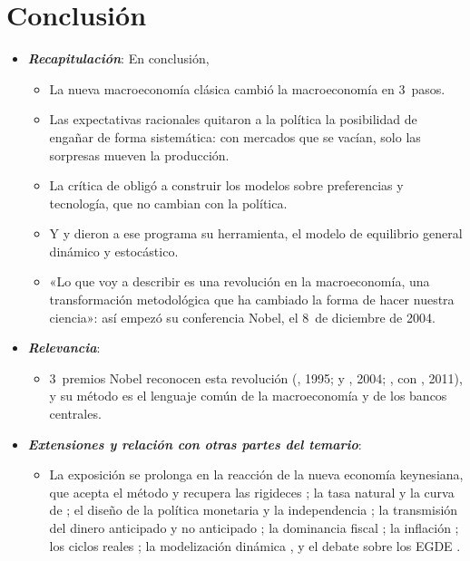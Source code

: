 \documentclass[11pt]{article}
\begin{document}
\section*{Conclusión}

\begin{itemize}
\item \textbf{\emph{Recapitulación}}: En conclusión,
  \begin{itemize}
  \item La nueva macroeconomía clásica cambió la macroeconomía en 3~pasos.

  \item Las expectativas racionales quitaron a la política la posibilidad de engañar de forma sistemática: con mercados que se vacían, solo las sorpresas mueven la producción.

  \item La crítica de  obligó a construir los modelos sobre preferencias y tecnología, que no cambian con la política.

  \item Y  y  dieron a ese programa su herramienta, el modelo de equilibrio general dinámico y estocástico.

  \item «Lo que voy a describir es una revolución en la macroeconomía, una transformación metodológica que ha cambiado la forma de hacer nuestra ciencia»: así empezó  su conferencia Nobel, el 8~de diciembre de 2004\nocite{Prescott2006Nobel}.
  \end{itemize}
\item \textbf{\emph{Relevancia}}:
  \begin{itemize}
  \item 3~premios Nobel reconocen esta revolución (, 1995;  y , 2004; , con , 2011)\nocite{NobelPrize1995Lucas,Nobel2004KydlandPrescott,Nobel2011SargentSims}, y su método es el lenguaje común de la macroeconomía y de los bancos centrales.
  \end{itemize}
\item \textbf{\emph{Extensiones y relación con otras partes del temario}}:
  \begin{itemize}
  \item La exposición se prolonga en la reacción de la nueva economía keynesiana, que acepta el método y recupera las rigideces ; la tasa natural y la curva de  ; el diseño de la política monetaria y la independencia ; la transmisión del dinero anticipado y no anticipado ; la dominancia fiscal ; la inflación ; los ciclos reales ; la modelización dinámica , y el debate sobre los EGDE .


\end{itemize}
\end{itemize}
\end{document}
